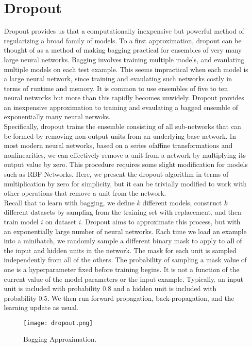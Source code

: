 \documentclass[11pt]{article}
\begin{document}
\section{Dropout}
\hspace*{1cm} Dropout provides us that a computationally inexpensive but powerful method of regularizing a broad family of models. To a first approximation, dropout can be thought of as a method of making bagging practical for ensembles of very many large neural networks. Bagging involves training multiple models, and evaulating multiple models on each test example. This seems impractical when each model is a large neural network, since training and evaulating such networks costly in terms of runtime and memory. It is common to use ensembles of five to ten neural networks but more than this rapidly becomes unwidely. Dropout provides an inexpensive approximation to training and evaulating a bagged ensemble of exponentially many neural netwoks.\\
Specifically, dropout trains the ensemble consisting of all sub-networks that
can be formed by removing non-output units from an underlying base network. In most modern neural networks, based on a series ofaffine transformations and nonlinearities, we can effectively remove a unit from a network by multiplying its output value by zero. This procedure requires some slight modification for models such as RBF Networks. Here, we present
the dropout algorithm in terms of multiplication by zero for simplicity, but it can be trivially modified to work with other operations that remove a unit from the network. \\
Recall that to learn with bagging, we define $k$ different models, construct $k$ different datasets by sampling from the training set with replacement, and then train model $i$ on dataset $i$. Dropout aims to approximate this process, but with an exponentially large number of neural networks. Each time we load an example into a minibatch, we randomly sample a different binary mask to apply to all of the input and hidden units in the network. The mask for each unit is sampled independently from all of the others. The probability of sampling a mask value of one is a hyperparameter fixed before training begins. It is not a function of the current value of the model parameters or the input example. Typically, an input unit is included with probability 0.8 and a hidden unit is included with probability 0.5. We then run forward propagation, back-propagation, and the
learning update as usual.
\begin{figure}[H]
\centering
\texttt{[image: dropout.png]}
\caption{Bagging Approximation.}
\label{fig:figure3}
\end{figure}
\end{document}

